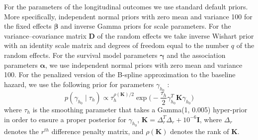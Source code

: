 For the parameters of the longitudinal outcomes we use standard default priors. More specifically, independent normal priors with zero mean and variance 100 for the fixed effects $\boldsymbol{\beta}$ and inverse Gamma priors for scale parameters. For the variance–covariance matrix $\boldsymbol{D}$ of the random effects we take inverse Wishart prior with an identity scale matrix and degrees of freedom equal to the number $q$ of the random effects. For the survival model parameters $\boldsymbol{\gamma}$ and the association parameters $\boldsymbol{\alpha}$, we use independent normal priors with zero mean and variance 100. For the penalized version of the B-spline approximation to the baseline hazard, we use the following prior for parameters $\gamma_{h_0}$ \citep{lang2004bayesian}:
\begin{equation*}
p(\gamma_{h_0} \mid \tau_h) \propto \tau_h^{\rho(\boldsymbol{K})/2} \exp\Big(-\frac{\tau_h}{2}\gamma_{h_0}^T \boldsymbol{K} \gamma_{h_0}\Big)
\end{equation*}
where $\tau_h$ is the smoothing parameter that takes a Gamma(1, 0.005) hyper-prior in order to ensure a proper posterior for $\gamma_{h_0}$, $\boldsymbol{K} = \Delta_r^T \Delta_r + 10^{-6} \boldsymbol{I}$, where $\Delta_r$ denotes the $r^{th}$ difference penalty matrix, and $\rho(\boldsymbol{K})$ denotes the rank of $\boldsymbol{K}$.